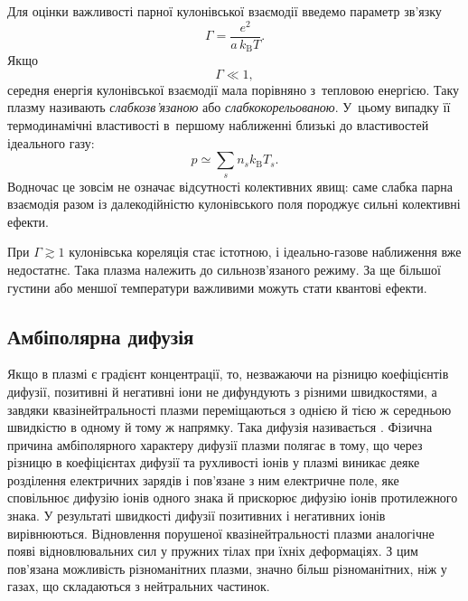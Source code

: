 Для оцінки важливості парної кулонівської взаємодії введемо параметр зв'язку
\begin{equation}
	\Gamma=
	\frac{e^2}{a\,k_{\mathrm B}T}.
\end{equation}
Якщо
\begin{equation}
	\Gamma\ll1,
\end{equation}
середня енергія кулонівської взаємодії мала порівняно з~тепловою енергією. Таку плазму називають \emph{слабкозв'язаною} або \emph{слабкокорельованою}. У~цьому випадку її термодинамічні властивості в~першому наближенні близькі до властивостей ідеального газу:
\begin{equation}
	p\simeq \sum_s n_s k_{\mathrm B}T_s.
\end{equation}
Водночас це зовсім не означає відсутності колективних явищ: саме слабка парна взаємодія разом із далекодійністю кулонівського поля породжує сильні колективні ефекти.

При $\Gamma\gtrsim1$ кулонівська кореляція стає істотною, і ідеально-газове наближення вже недостатнє. Така плазма належить до сильнозв'язаного режиму. За ще більшої густини або меншої температури важливими можуть стати квантові ефекти.

\subsection{Амбіполярна дифузія}

Якщо в плазмі є градієнт концентрації, то, незважаючи на різницю коефіцієнтів дифузії, позитивні й негативні іони не дифундують з різними швидкостями, а завдяки квазінейтральності плазми переміщаються з однією й тією ж середньою швидкістю в одному й тому ж напрямку. Така дифузія називається . Фізична причина амбіполярного характеру дифузії плазми полягає в тому, що через різницю в коефіцієнтах дифузії та рухливості іонів у плазмі виникає деяке розділення електричних зарядів і пов'язане з ним електричне поле, яке сповільнює дифузію іонів одного знака й прискорює дифузію іонів протилежного знака. У результаті швидкості дифузії позитивних і негативних іонів вирівнюються. Відновлення порушеної квазінейтральності плазми аналогічне появі відновлювальних сил у пружних тілах при їхніх деформаціях. З цим пов'язана можливість різноманітних  плазми, значно більш різноманітних, ніж у газах, що складаються з нейтральних частинок.

